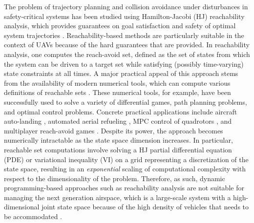 The problem of trajectory planning and collision avoidance under disturbances in safety-critical systems has been studied using Hamilton-Jacobi (HJ) reachability analysis, which provides guarantees on goal satisfaction and safety of optimal system trajectories \cite{Barron90, Mitchell05, Bokanowski10, Bokanowski11, Margellos11, Fisac15}. Reachability-based methods are particularly suitable in the context of UAVs because of the hard guarantees that are provided. In reachability analysis, one computes the reach-avoid set, defined as the set of states from which the system can be driven to a target set while satisfying (possibly time-varying) state constraints at all times. A major practical appeal of this approach stems from the availability of modern numerical tools, which can compute various definitions of reachable sets \cite{Sethian96, Osher02, Mitchell02, Mitchell07b}. These numerical tools, for example, have been successfully used to solve a variety of differential games, path planning problems, and optimal control problems. Concrete practical applications include aircraft auto-landing \cite{Bayen07}, automated aerial refueling \cite{Ding08}, MPC control of quadrotors \cite{Bouffard12}, and multiplayer reach-avoid games \cite{Huang11}. Despite its power, the approach becomes numerically intractable as the state space dimension increases. In particular, reachable set computations involve solving a HJ partial differential equation (PDE) or variational inequality (VI) on a grid representing a discretization of the state space, resulting in an \textit{exponential} scaling of computational complexity with respect to the dimensionality of the problem. Therefore, as such, dynamic programming-based approaches such as reachability analysis are not suitable for managing the next generation airspace, which is a large-scale system with a high-dimensional joint state space because of the high density of vehicles that needs to be accommodated \cite{Kopardekar16}.  

